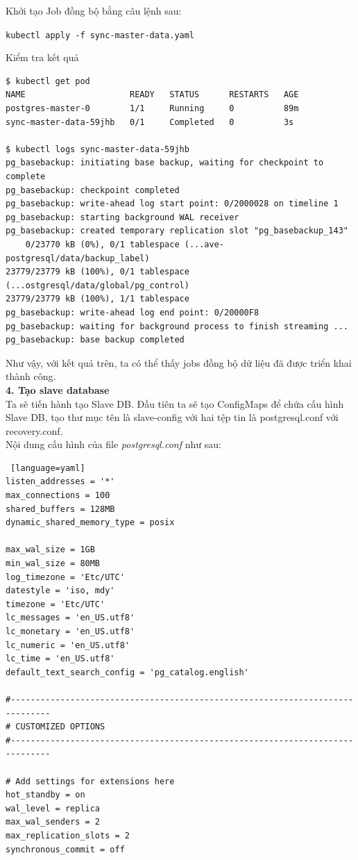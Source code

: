 \noindent Khởi tạo Job đồng bộ bằng câu lệnh sau:
\begin{center}
\lstinline|kubectl apply -f sync-master-data.yaml|
\end{center}
\noindent Kiểm tra kết quả
\begin{lstlisting}[language=text]
$ kubectl get pod
NAME                     READY   STATUS      RESTARTS   AGE
postgres-master-0        1/1     Running     0          89m
sync-master-data-59jhb   0/1     Completed   0          3s

$ kubectl logs sync-master-data-59jhb
pg_basebackup: initiating base backup, waiting for checkpoint to complete
pg_basebackup: checkpoint completed
pg_basebackup: write-ahead log start point: 0/2000028 on timeline 1
pg_basebackup: starting background WAL receiver
pg_basebackup: created temporary replication slot "pg_basebackup_143"
    0/23770 kB (0%), 0/1 tablespace (...ave-postgresql/data/backup_label)
23779/23779 kB (100%), 0/1 tablespace (...ostgresql/data/global/pg_control)
23779/23779 kB (100%), 1/1 tablespace
pg_basebackup: write-ahead log end point: 0/20000F8
pg_basebackup: waiting for background process to finish streaming ...
pg_basebackup: base backup completed
\end{lstlisting}
\noindent Như vậy, với kết quả trên, ta có thể thấy jobs đồng bộ dữ liệu đã được triển khai thành công. \\[0.5cm]
\textbf{4. Tạo slave database}\\[0.5cm]
\noindent Ta sẽ tiến hành tạo Slave DB. Đầu tiên ta sẽ tạo ConfigMaps để chứa cấu hình Slave DB, tạo thư mục tên là slave-config với hai tệp tin là postgresql.conf với recovery.conf.\\[0.5cm]
\noindent Nội dung cấu hình của file \textit{postgresql.conf} như sau:
\begin{lstlisting} [language=yaml]
listen_addresses = '*'
max_connections = 100
shared_buffers = 128MB
dynamic_shared_memory_type = posix

max_wal_size = 1GB
min_wal_size = 80MB
log_timezone = 'Etc/UTC'
datestyle = 'iso, mdy'
timezone = 'Etc/UTC'
lc_messages = 'en_US.utf8'
lc_monetary = 'en_US.utf8'
lc_numeric = 'en_US.utf8'
lc_time = 'en_US.utf8'
default_text_search_config = 'pg_catalog.english'

#------------------------------------------------------------------------------
# CUSTOMIZED OPTIONS
#------------------------------------------------------------------------------

# Add settings for extensions here
hot_standby = on
wal_level = replica
max_wal_senders = 2
max_replication_slots = 2
synchronous_commit = off
\end{lstlisting}
